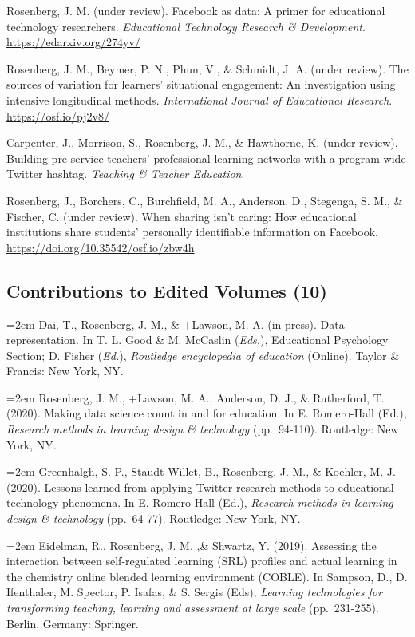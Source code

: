 \documentclass[
  14,
]{article}
\begin{document}
Rosenberg, J. M. (under review). Facebook as data: A primer for
educational technology researchers. \emph{Educational Technology
Research \& Development}. \url{https://edarxiv.org/274yv/}

Rosenberg, J. M., Beymer, P. N., Phun, V., \& Schmidt, J. A. (under
review). The sources of variation for learners' situational engagement:
An investigation using intensive longitudinal methods.
\emph{International Journal of Educational Research}.
\url{https://osf.io/pj2v8/}

Carpenter, J., Morrison, S., Rosenberg, J. M., \& Hawthorne, K. (under
review). Building pre-service teachers' professional learning networks
with a program-wide Twitter hashtag. \emph{Teaching \& Teacher
Education}.

Rosenberg, J., Borchers, C., Burchfield, M. A., Anderson, D., Stegenga,
S. M., \& Fischer, C. (under review). When sharing isn't caring: How
educational institutions share students' personally identifiable
information on Facebook. \url{https://doi.org/10.35542/osf.io/zbw4h}

\hypertarget{contributions-to-edited-volumes-10}{%
\subsection{Contributions to Edited Volumes
(10)}\label{contributions-to-edited-volumes-10}}

\hangindent=2em Dai, T., Rosenberg, J. M., \& +Lawson, M. A. (in press).
Data representation. In T. L. Good \& M. McCaslin (\emph{Eds.}),
Educational Psychology Section; D. Fisher (\emph{Ed.}), \emph{Routledge
encyclopedia of education} (Online). Taylor \& Francis: New York, NY.

\hangindent=2em Rosenberg, J. M., +Lawson, M. A., Anderson, D. J., \&
Rutherford, T. (2020). Making data science count in and for education.
In E. Romero-Hall (Ed.), \emph{Research methods in learning design \&
technology} (pp.~94-110). Routledge: New York, NY.

\hangindent=2em Greenhalgh, S. P., Staudt Willet, B., Rosenberg, J. M.,
\& Koehler, M. J. (2020). Lessons learned from applying Twitter research
methods to educational technology phenomena. In E. Romero-Hall (Ed.),
\emph{Research methods in learning design \& technology} (pp.~64-77).
Routledge: New York, NY.

\hangindent=2em Eidelman, R., Rosenberg, J. M. ,\& Shwartz, Y. (2019).
Assessing the interaction between self-regulated learning (SRL) profiles
and actual learning in the chemistry online blended learning environment
(COBLE). In Sampson, D., D. Ifenthaler, M. Spector, P. Isafas, \& S.
Sergis (Eds), \emph{Learning technologies for transforming teaching,
learning and assessment at large scale} (pp.~231-255). Berlin, Germany:
Springer.
\end{document}
